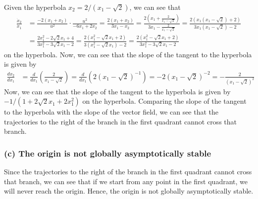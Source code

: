 Given the hyperbola \( x_2 = 2 / (x_1 - \sqrt{2}) \), we can see that
\begin{align*}
    \frac{\dot{x}_2}{\dot{x}_1}
     & =
    \frac{-2 (x_1 + x_2)}{u^2} \cdot \frac{u^2}{-6 x_1 + 2 x_2}
    =
    \frac{2 (x_1 + x_2)}{3 x_1 - x_2}
    =
    \frac{2 \left( x_1 + \frac{2}{x_1 - \sqrt{2}} \right)}{3 x_1 - \frac{2}{x_1 - \sqrt{2}}}
    =
    \frac{2 \left( x_1 (x_1 - \sqrt{2}) + 2 \right)}{3 x_1 (x_1 - \sqrt{2}) - 2}
    \\ & =
    \frac{2 x_1^2 - 2 \sqrt{2} x_1 + 4}{3 x_1^2 - 3 \sqrt{2} x_1 - 2}
    =
    \frac{2 (x_1^2 - \sqrt{2} x_1 + 2)}{3 (x_1^2 - \sqrt{2} x_1) - 2}
    =
    \frac{2 (x_1^2 - \sqrt{2} x_1 + 2)}{3 x_1^2 - 3 \sqrt{2} x_1 - 2}
\end{align*}
on the hyperbola.
Now, we can see that the slope of the tangent to the hyperbola is given by
\begin{align*}
    \frac{d x_2}{d x_1}
     & =
    \frac{d}{d x_1} \left( \frac{2}{x_1 - \sqrt{2}} \right)
    =
    \frac{d}{d x_1} \left( 2 (x_1 - \sqrt{2})^{-1} \right)
    =
    -2 (x_1 - \sqrt{2})^{-2}
    =
    -\frac{2}{(x_1 - \sqrt{2})^2}
\end{align*}
Now, we can see that the slope of the tangent to the hyperbola is given by \( -1 / (1 + 2 \sqrt{2} x_1 + 2 x_1^2) \) on the hyperbola.
Comparing the slope of the tangent to the hyperbola with the slope of the vector field, we can see that the trajectories to the right of the branch in the first quadrant cannot cross that branch.

\subsubsection*{(c) The origin is not globally asymptotically stable}

Since the trajectories to the right of the branch in the first quadrant cannot cross that branch, we can see that if we start from any point in the first quadrant, we will never reach the origin.
Hence, the origin is not globally asymptotically stable.
